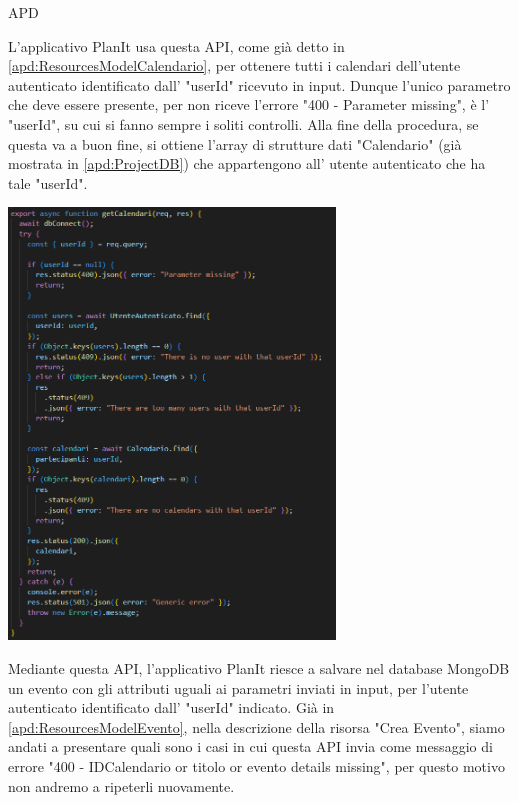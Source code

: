 \begin{listaPersonale} {APD}
\begin{listaPersonale2}[APD]{}
                L'applicativo PlanIt usa questa API, come già detto in \ref{apd:ResourcesModelCalendario}, per ottenere tutti i calendari dell'utente autenticato identificato dall' "userId" ricevuto in input. Dunque l'unico parametro che deve essere presente, per non riceve l'errore "400 - Parameter missing", è l' "userId", su cui si fanno sempre i soliti controlli. Alla fine della procedura, se questa va a buon fine, si ottiene l'array di strutture dati "Calendario" (già mostrata in \ref{apd:ProjectDB}) che appartengono all' utente autenticato che ha tale "userId".
                \begin{center}
                    \includegraphics[width=0.65\textwidth, height=0.55\textheight]{img/png/APIs/getCalendari.png}
                \end{center}
                \newpage
                Mediante questa API, l'applicativo PlanIt riesce a salvare nel database MongoDB un evento con gli attributi uguali ai parametri inviati in input, per l'utente autenticato identificato dall' "userId" indicato. Già in \ref{apd:ResourcesModelEvento}, nella descrizione della risorsa "Crea Evento", siamo andati a presentare quali sono i casi in cui questa API invia come messaggio di errore "400 - IDCalendario or titolo or evento details missing", per questo motivo non andremo a ripeterli nuovamente. \\

\end{listaPersonale2}
\end{listaPersonale}
